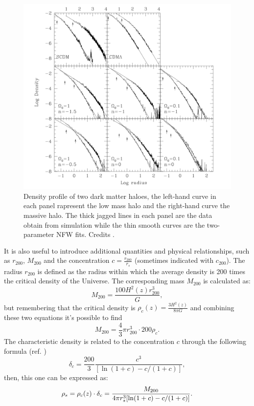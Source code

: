 \begin{figure}[h!]
\centering
    \includegraphics[width=0.68\linewidth]{Images/Chapter2/NFW_1996.png}
    \caption[Evidence for the universal NFW density profile]{Density profile of two dark matter haloes, the left-hand curve in each panel rapresent the low mass halo and the right-hand curve the massive halo. The thick jagged lines in each panel are the data obtain from simulation while the thin smooth curves are the two-parameter NFW fits. Credits \cite{Navarro_1997}.}
\label{NFW_fit_1996}
\end{figure}

It is also useful to introduce additional quantities and physical relationships, such as $r_{200}$, $M_{200}$ and the concentration $c = \frac{r_{200}}{r_s}$ (sometimes indicated with $c_{200}$). 
The radius $r_{200}$ is defined as the radius within which the average density is 200 times the critical density of the Universe. The corresponding mass $M_{200}$ is calculated as:
\begin{equation}
M_{200}=\frac{100H^2(z)r_{200}^3}{G},
\end{equation}
but remembering that the critical density is $\rho_c(z)=\frac{3H^2(z)}{8\pi G}$ and combining these two equations it's possible to find
\begin{equation}
    M_{200} = \frac{4}{3} \pi r_{200}^3 \cdot 200 \rho_c.
\end{equation}
The characteristic density is related to the concentration $c$ through the following formula (ref. \cite{Navarro_1997})
\begin{equation}
    \delta_c = \frac{200}{3} \frac{c^3}{[\ln(1+c)-c/(1+c)]},
\end{equation}
then, this one can be expressed as:
\begin{equation}
    \rho_s = \rho_c(z) \cdot \delta_c = \frac{M_{200}}{4\pi r_s^3 \qty[\ln(1+c)-c/(1+c)]}.
\end{equation}

